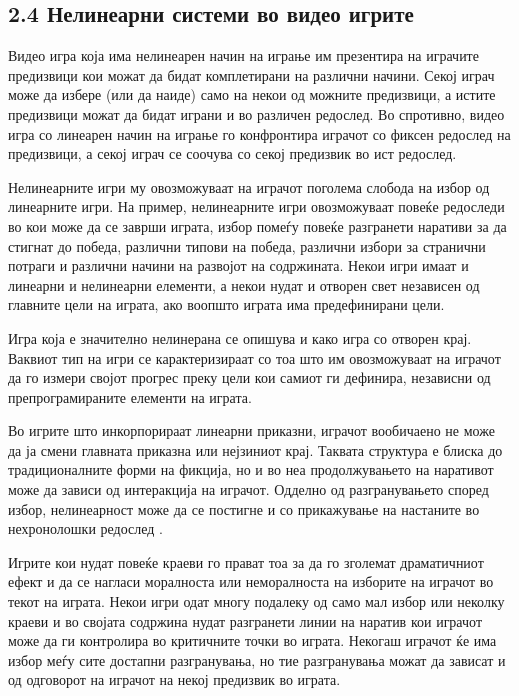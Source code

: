 \subsection{2.4 Нелинеарни системи во видео игрите}

Видео игра која има нелинеарен начин на играње им презентира на играчите предизвици кои можат да бидат комплетирани на различни начини. Секој играч може да избере (или да наиде) само на некои од можните предизвици, а истите предизвици можат да бидат играни и во различен редослед. Во спротивно, видео игра со линеарен начин на играње го конфронтира играчот со фиксен редослед на предизвици, а секој играч се соочува со секој предизвик во ист редослед. \cite{ref2}

Нелинеарните игри му овозможуваат на играчот поголема слобода на избор од линеарните игри. На пример, нелинеарните игри овозможуваат повеќе редоследи во кои може да се заврши играта, избор помеѓу повеќе разгранети наративи за да стигнат до победа, различни типови на победа, различни избори за странични потраги и различни начини на развојот на содржината. Некои игри имаат и линеарни и нелинеарни елементи, а некои нудат и отворен свет независен од главните цели на играта, ако воопшто играта има предефинирани цели.

Игра која е значително нелинерана се опишува и како игра со отворен крај. Ваквиот тип на игри се карактеризираат со тоа што им овозможуваат на играчот да го измери својот прогрес преку цели кои самиот ги дефинира, независни од препрограмираните елементи на играта.

Во игрите што инкорпорираат линеарни приказни, играчот вообичаено не може да ја смени главната приказна или нејзиниот крај. Таквата структура е блиска до традиционалните форми на фикција, но и во неа продолжувањето на наративот може да зависи од интеракција на играчот. Одделно од разгранувањето според избор, нелинеарност може да се постигне и со прикажување на настаните во нехронолошки редослед \cite{ref5,ref10}.

Игрите кои нудат повеќе краеви го прават тоа за да го зголемат драматичниот ефект и да се нагласи моралноста или неморалноста на изборите на играчот во текот на играта. Некои игри одат многу подалеку од само мал избор или неколку краеви и во својата содржина нудат разгранети линии на наратив кои играчот може да ги контролира во критичните точки во играта. Некогаш играчот ќе има избор меѓу сите достапни разгранувања, но тие разгранувања можат да зависат и од одговорот на играчот на некој предизвик во играта. \cite{ref2}

